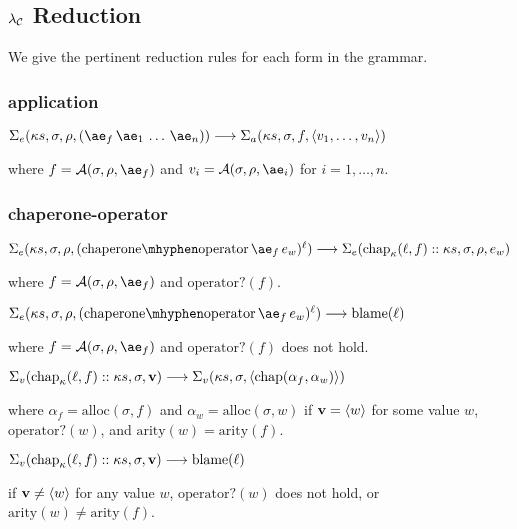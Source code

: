 \documentclass{sigplanconf}
\begin{document}
\newcommand{\letk}[3]{\mathrm{let}_\kappa(#1,#2,#3)}
\newcommand{\letreck}[3]{\mathrm{letrec}_\kappa(#1,#2,#3)}
\newcommand{\ifk}[3]{\mathrm{if}_\kappa(#1,#2,#3)}
\newcommand{\ifd}[3]{\delta_\mathrm{if}(#1,#2,#3)}
\newcommand{\andk}[2]{\mathrm{and}_\kappa(#1,#2)}
\newcommand{\ork}[2]{\mathrm{or}_\kappa(#1,#2)}

\subsection{$\lambda_{\mathcal{C}}$ Reduction}

We give the pertinent reduction rules for each form in the grammar.

\subsubsection{application}

\noindent
$\red{\sexp{\ks}{\sigma}{\rho}{\appe{\ae_f}{\ae_1\,\dots\,\ae_n}}}{\sapp{\ks}{\sigma}{f}{\langle v_1,\dots,v_n\rangle}}$

\noindent
where $f=\A{\sigma}{\rho}{\ae_f}$ and $v_i=\A{\sigma}{\rho}{\ae_i}$ for $i=1,\dots,n$.

\subsubsection{chaperone-operator}

\noindent
$\red{\sexp{\ks}{\sigma}{\rho}{\chae{\ae_f}{e_w}}}{\sexp{\chak{f}::\ks}{\sigma}{\rho}{e_w}}$

\noindent
where $f=\A{\sigma}{\rho}{\ae_f}$ and $\mathrm{operator?}(f)$.

\noindent
$\red{\sexp{\ks}{\sigma}{\rho}{\chae{\ae_f}{e_w}}}{\sbla{\ell}}$

\noindent
where $f=\A{\sigma}{\rho}{\ae_f}$ and $\mathrm{operator?}(f)$ does not hold.

\noindent
$\Sigma_v(\mathrm{chap}_\kappa(\ell,f)::\kappa s,\sigma,\mathbf{v})\longrightarrow \Sigma_v(\kappa s,\sigma,\langle\mathrm{chap}(\alpha_f,\alpha_w)\rangle)$

\noindent
where $\alpha_f=\mathrm{alloc}(\sigma,f)$ and $\alpha_w=\mathrm{alloc}(\sigma,w)$
if $\mathbf{v}=\langle w\rangle$ for some value $w$, $\mathrm{operator?}(w)$, and $\mathrm{arity}(w)=\mathrm{arity}(f)$.

\noindent
$\Sigma_v(\mathrm{chap}_\kappa(\ell,f)::\kappa s,\sigma,\mathbf{v})\longrightarrow \mathrm{blame}(\ell)$

\noindent
if $\mathbf{v}\ne\langle w\rangle$ for any value $w$, $\mathrm{operator?}(w)$ does not hold, or $\mathrm{arity}(w)\ne\mathrm{arity}(f)$.
\end{document}
